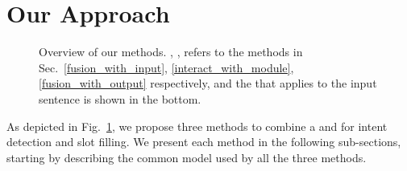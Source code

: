 \section{Our Approach}
\begin{figure}[!t]
\centering
{}
\hspace{.5in}
\caption{Overview of our methods. , ,  refers to the methods in
Sec.~\ref{fusion_with_input}, \ref{interact_with_module}, \ref{fusion_with_output} respectively, and the \RE that applies to the input
sentence is shown in the bottom.}
\label{fig_overview}
\end{figure}

As depicted in Fig.~\ref{fig_overview}, we propose three methods to combine a \NN and \REs for intent detection and slot filling. We
present each method in the following sub-sections, starting by describing the common \NN model used by all the three methods.

